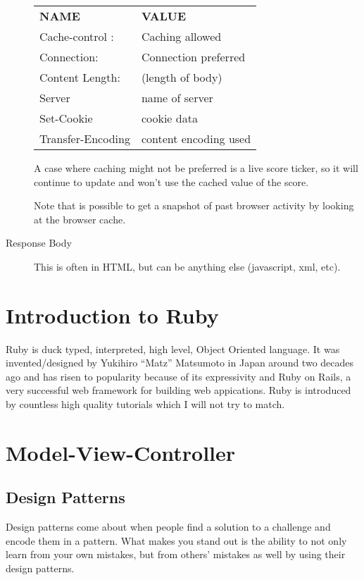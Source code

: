 \documentclass[11pt]{article}
\begin{document}
\begin{description}
\begin{tabular}{ l l }
  \textbf{NAME} & \textbf{VALUE}  \\
  Cache-control : & Caching allowed \\
  Connection: & Connection preferred \\
  Content Length: & (length of body) \\
  Server & name of server  \\
  Set-Cookie & cookie data  \\
  Transfer-Encoding & content encoding used  \\
\end{tabular}

A case where caching might not be preferred is a live score ticker, so it will continue to update and won’t use the cached value of the score.

Note that is possible to get a snapshot of past browser activity by looking at the browser cache.

\item[Response Body]
This is often in HTML, but can be anything else (javascript, xml, etc).
\end{description}

\section{Introduction to Ruby}
\label{sec:ruby}

Ruby is duck typed, interpreted, high level, Object Oriented language. It was invented/designed by Yukihiro ``Matz'' Matsumoto in Japan around two decades ago and has risen to popularity because of its expressivity and Ruby on Rails, a very successful web framework for building web appications. Ruby is introduced by countless high quality tutorials which I will not try to match.


\section{Model-View-Controller}
\label{sec:MVC}

\subsection{Design Patterns}
Design patterns come about when people find a solution to a challenge and encode them in a pattern. What makes you stand out is the ability to not only learn from your own mistakes, but from others' mistakes as well by using their design patterns.
\end{document}
